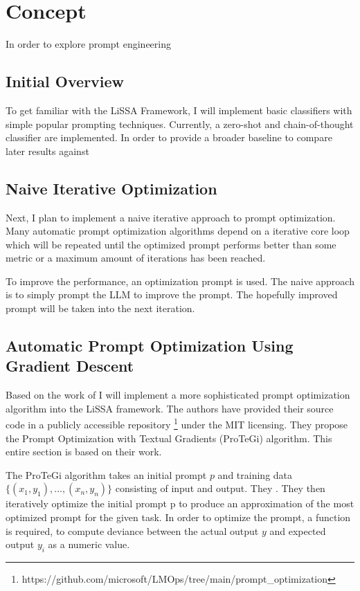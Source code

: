 \chapter{Concept}
\label{conecpt}

In order to explore prompt engineering

\section{Initial Overview}
To get familiar with the LiSSA Framework, I will implement basic classifiers with simple popular prompting techniques.
Currently, a zero-shot and chain-of-thought classifier are implemented. In order to provide a broader baseline to compare later results against 

\section{Naive Iterative Optimization}
Next, I plan to implement a naive iterative approach to prompt optimization. Many automatic prompt optimization algorithms depend on a iterative core loop which will be repeated until the optimized prompt performs better than some metric or a maximum amount of iterations has been reached.

To improve the performance, an optimization prompt is used. The naive approach is to simply prompt the LLM to improve the prompt. The hopefully improved prompt will be taken into the next iteration.

\section{Automatic Prompt Optimization Using Gradient Descent}
Based on the work of  I will implement a more sophisticated prompt optimization algorithm into the LiSSA framework. The authors have provided their source code in a publicly accessible repository \footnote{https://github.com/microsoft/LMOps/tree/main/prompt\_optimization} under the MIT licensing. They propose the Prompt Optimization with Textual Gradients (ProTeGi) algorithm. This entire section is based on their work.

The ProTeGi algorithm takes an initial prompt $p$ and training data $\{(x_1, y_1), \dots, (x_n, y_n)\}$ consisting of input and output. They . They then iteratively optimize the initial prompt p to produce an approximation of the most optimized prompt for the given task. In order to optimize the prompt, a function is required, to compute deviance between the actual output $y$ and expected output $y_i$ as a numeric value.


